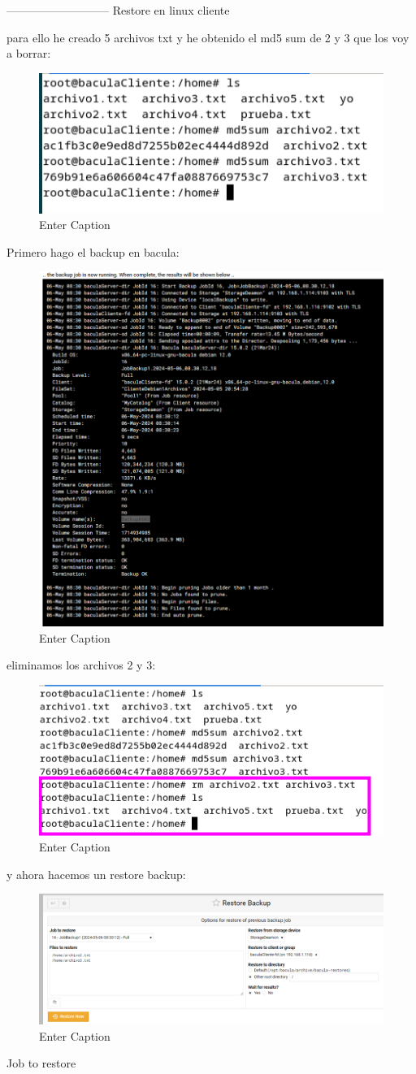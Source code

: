 ---------------------------
Restore en linux cliente

para ello he creado 5 archivos txt y he obtenido el md5 sum de 2 y 3 que los voy a borrar:

\begin{figure}[H]
    \centering
    \includegraphics[width=0.5\linewidth]{instalacionBacula/5ARCHIVOS.png}
    \caption{Enter Caption}
\end{figure}

Primero hago el backup en bacula:
\begin{figure}[H]
    \centering
    \includegraphics[width=0.5\linewidth]{instalacionBacula/backup0002.png}
    \caption{Enter Caption}
\end{figure}

eliminamos los archivos 2 y 3:

\begin{figure}[H]
    \centering
    \includegraphics[width=0.5\linewidth]{instalacionBacula/rmArchivo23.png}
    \caption{Enter Caption}
\end{figure}

y ahora hacemos un restore backup:

\begin{figure}[H]
    \centering
    \includegraphics[width=0.5\linewidth]{instalacionBacula/resBackup.png}
    \caption{Enter Caption}
\end{figure}
Job to restore

